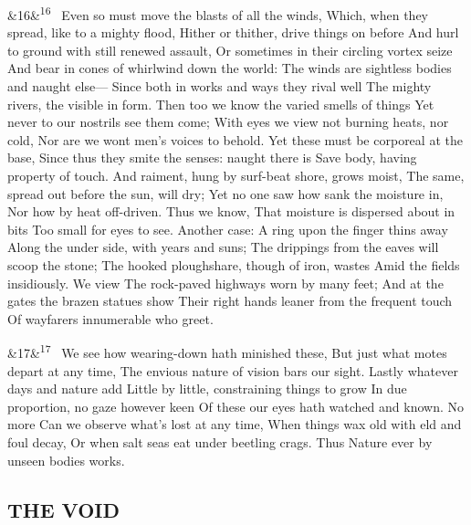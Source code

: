 \documentclass[12pt]{article}
\newcommand{\para}[1][]{\par\noindent\ifx&#1&\else\textsuperscript{\footnotesize #1}~\fi}
\begin{document}
\para[16] Even so must move the blasts of all the winds, Which, when they spread, like to a mighty flood, Hither or thither, drive things on before And hurl to ground with still renewed assault, Or sometimes in their circling vortex seize And bear in cones of whirlwind down the world: The winds are sightless bodies and naught else--- Since both in works and ways they rival well The mighty rivers, the visible in form. Then too we know the varied smells of things Yet never to our nostrils see them come; With eyes we view not burning heats, nor cold, Nor are we wont men's voices to behold. Yet these must be corporeal at the base, Since thus they smite the senses: naught there is Save body, having property of touch. And raiment, hung by surf-beat shore, grows moist, The same, spread out before the sun, will dry; Yet no one saw how sank the moisture in, Nor how by heat off-driven. Thus we know, That moisture is dispersed about in bits Too small for eyes to see. Another case: A ring upon the finger thins away Along the under side, with years and suns; The drippings from the eaves will scoop the stone; The hooked ploughshare, though of iron, wastes Amid the fields insidiously. We view The rock-paved highways worn by many feet; And at the gates the brazen statues show Their right hands leaner from the frequent touch Of wayfarers innumerable who greet.

\para[17] We see how wearing-down hath minished these, But just what motes depart at any time, The envious nature of vision bars our sight. Lastly whatever days and nature add Little by little, constraining things to grow In due proportion, no gaze however keen Of these our eyes hath watched and known. No more Can we observe what's lost at any time, When things wax old with eld and foul decay, Or when salt seas eat under beetling crags. Thus Nature ever by unseen bodies works.

\subsection*{THE VOID}
\end{document}
